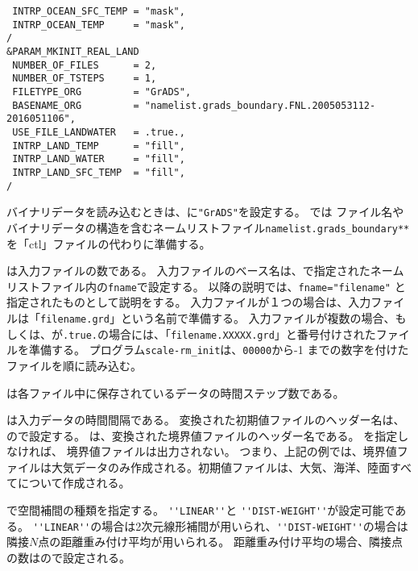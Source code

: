 {\verb| INTRP_OCEAN_SFC_TEMP = "mask",|\\
\verb| INTRP_OCEAN_TEMP     = "mask",|\\
\verb|/|\\
\verb|&PARAM_MKINIT_REAL_LAND|\\
\verb| NUMBER_OF_FILES      = 2,|\\
\verb| NUMBER_OF_TSTEPS     = 1, |\\
\verb| FILETYPE_ORG         = "GrADS",|\\
\verb| BASENAME_ORG         = "namelist.grads_boundary.FNL.2005053112-2016051106",|\\
\verb| USE_FILE_LANDWATER   = .true.,|\\
\verb| INTRP_LAND_TEMP      = "fill",|\\
\verb| INTRP_LAND_WATER     = "fill",|\\
\verb| INTRP_LAND_SFC_TEMP  = "fill",|\\
\verb|/|\\
}


バイナリデータを読み込むときは、に\verb|"GrADS"|を設定する。
\scalerm では ファイル名やバイナリデータの構造を含むネームリストファイル\verb|namelist.grads_boundary**|を「ctl」ファイルの代わりに準備する。

は入力ファイルの数である。
入力ファイルのベース名は、で指定されたネームリストファイル内の\verb|fname|で設定する。
以降の説明では、\verb|fname="filename"| と指定されたものとして説明をする。
入力ファイルが１つの場合は、入力ファイルは「\verb|filename.grd|」という名前で準備する。
入力ファイルが複数の場合、もしくは、が\verb|.true.|の場合には、「\verb|filename.XXXXX.grd|」と番号付けされたファイルを準備する。
プログラム\verb|scale-rm_init|は、\verb|00000|から-1 までの数字を付けたファイルを順に読み込む。

は各ファイル中に保存されているデータの時間ステップ数である。

は入力データの時間間隔である。
変換された初期値ファイルのヘッダー名は、ので設定する。
は、変換された境界値ファイルのヘッダー名である。
を指定しなければ、 境界値ファイルは出力されない。
つまり、上記の例では、境界値ファイルは大気データのみ作成される。初期値ファイルは、大気、海洋、陸面すべてについて作成される。


で空間補間の種類を指定する。
\verb|''LINEAR''|と \verb|''DIST-WEIGHT''|が設定可能である。
\verb|''LINEAR''|の場合は2次元線形補間が用いられ、\verb|''DIST-WEIGHT''|の場合は隣接$N$点の距離重み付け平均が用いられる。
距離重み付け平均の場合、隣接点の数はので設定される。

